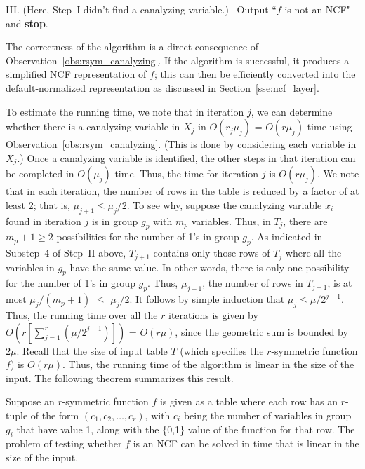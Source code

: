 \smallskip
\noindent
III. (Here, Step~I didn't find a canalyzing variable.)~ 
Output ``$f$ is not an NCF" and \textbf{stop}.

\medskip
\noindent
The correctness of the algorithm is a direct consequence of
Observation~\ref{obs:rsym_canalyzing}. If the algorithm is successful,
it produces a simplified NCF representation of $f$; this can then be
efficiently converted into the default-normalized representation as
discussed in Section~\ref{sse:ncf_layer}.

To estimate the running time, we note that in iteration $j$, we can
determine whether there is a canalyzing variable in $X_j$
in $O(r_j \mu_j)$ = $O(r \mu_j)$ time using 
Observation~\ref{obs:rsym_canalyzing}.
(This is done by considering each variable in $X_j$.)
Once a canalyzing variable is identified, the other steps in that iteration
can be completed in $O(\mu_j)$ time.
Thus, the time for iteration $j$ is $O(r \mu_j)$.
We note that in each iteration, the number of rows in the table
is reduced by a factor of at least 2; that is, $\mu_{j+1} \leq \mu_j/2$.
To see why, suppose the canalyzing variable $x_i$ found in iteration $j$
is in group $g_p$ with $m_p$ variables. 
Thus, in $T_j$, there are $m_p+1 \geq 2$ possibilities for the number of 1's 
in group $g_p$. 
As indicated in Substep~4 of Step~II above, $T_{j+1}$ 
contains only those rows of $T_j$ where all the variables 
in $g_p$ have the same value.
In other words, there is only one possibility for the number of
1's in group $g_p$.
Thus, $\mu_{j+1}$, the number of rows in $T_{j+1}$,
is at most $\mu_j/(m_p+1)$ $\leq$ $\mu_j/2$.
It follows by simple induction that $\mu_j \leq \mu/2^{j-1}$.
Thus, the running time over all the $r$ iterations is given by
$O(r [\sum_{j=1}^{r}(\mu/2^{j-1})])$ = $O(r\mu)$, since the
geometric sum is bounded by $2\mu$.
Recall that the size of input table $T$ 
(which specifies the $r$-symmetric function $f$)
is $O(r\mu)$. 
Thus, the running time of the algorithm
is linear in the size of the input.
The following theorem summarizes this result. 

\begin{theorem}\label{thm:rsym_canalyzing}
Suppose an $r$-symmetric function $f$ is given as a table where
each row has an $r$-tuple of the form $(c_1, c_2, \ldots, c_r)$,
with $c_i$ being the number of variables in group $g_i$ that have value 1,
along with the \{0,1\} value of the function for that row.
The problem of testing whether $f$ 
is an NCF can be solved in time that 
is linear in the size of the input. \QED
\end{theorem}


